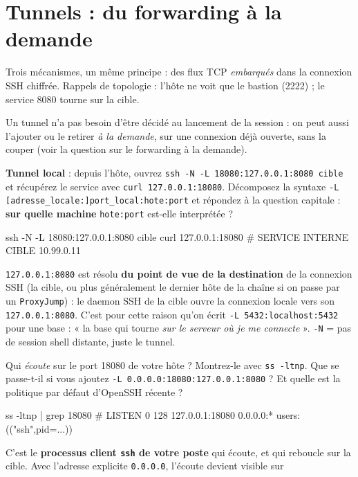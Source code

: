 \documentclass[a4paper,10pt]{exam}
\begin{document}
\section{Tunnels : du forwarding à la demande}

Trois mécanismes, un même principe : des flux TCP \emph{embarqués} dans la connexion SSH
chiffrée. Rappels de topologie : l'hôte ne voit que le bastion (2222) ; le service 8080
tourne sur la cible.

Un tunnel n'a pas besoin d'être décidé au lancement de la session : on peut aussi
l'ajouter ou le retirer \emph{à la demande}, sur une connexion déjà ouverte, sans la
couper (voir la question sur le forwarding à la demande).

\begin{questions}
\question \textbf{Tunnel local} : depuis l'hôte, ouvrez
\texttt{ssh -N -L 18080:127.0.0.1:8080 cible} et récupérez le service avec
\texttt{curl 127.0.0.1:18080}. Décomposez la syntaxe \texttt{-L
[adresse\_locale:]port\_local:hote:port} et répondez à la question capitale :
\textbf{sur quelle machine} \texttt{hote:port} est-elle interprétée ?
\begin{solution}
\begin{bashcode}
ssh -N -L 18080:127.0.0.1:8080 cible
curl 127.0.0.1:18080
# SERVICE INTERNE CIBLE 10.99.0.11
\end{bashcode}
\texttt{127.0.0.1:8080} est résolu \textbf{du point de vue de la destination} de la
connexion SSH (la cible, ou plus généralement le dernier hôte de la chaîne si on passe
par un \texttt{ProxyJump}) : le daemon SSH de la cible ouvre la connexion locale vers son
\texttt{127.0.0.1:8080}. C'est pour cette raison qu'on écrit
\texttt{-L 5432:localhost:5432} pour une base : « la base qui tourne \emph{sur le serveur
où je me connecte} ».
\texttt{-N} = pas de session shell distante, juste le tunnel.
\end{solution}
\question Qui \emph{écoute} sur le port 18080 de votre hôte ? Montrez-le avec
\texttt{ss -ltnp}. Que se passe-t-il si vous ajoutez
\texttt{-L 0.0.0.0:18080:127.0.0.1:8080} ? Et quelle est la politique par défaut d'OpenSSH
récente ?
\begin{solution}
\begin{bashcode}
ss -ltnp | grep 18080
# LISTEN  0  128  127.0.0.1:18080  0.0.0.0:*  users:(("ssh",pid=...))
\end{bashcode}
C'est le \textbf{processus client \texttt{ssh} de votre poste} qui écoute, et qui reboucle
sur la cible. Avec l'adresse explicite \texttt{0.0.0.0}, l'écoute devient visible sur

\end{solution}
\end{questions}
\end{document}
